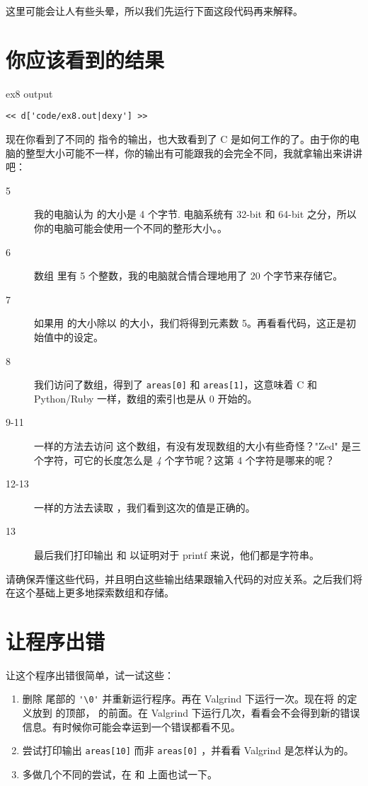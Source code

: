 这里可能会让人有些头晕，所以我们先运行下面这段代码再来解释。

\section{你应该看到的结果}

\begin{code}{ex8 output}
\begin{lstlisting}
<< d['code/ex8.out|dexy'] >>
\end{lstlisting}
\end{code}

现在你看到了不同的  指令的输出，也大致看到了 C 是如何工作的了。由于你的电脑的整型大小可能不一样，你的输出有可能跟我的会完全不同，我就拿输出来讲讲吧：

\begin{description}
\item [5] 我的电脑认为  的大小是 4 个字节. 电脑系统有 32-bit 和 64-bit 之分，所以你的电脑可能会使用一个不同的整形大小。。
\item [6] 数组  里有 5 个整数，我的电脑就合情合理地用了 20 个字节来存储它。
\item [7] 如果用  的大小除以  的大小，我们将得到元素数 5。再看看代码，这正是初始值中的设定。
\item [8] 我们访问了数组，得到了 \verb|areas[0]| 和 \verb|areas[1]|，这意味着 C 和 Python/Ruby 一样，数组的索引也是从 0 开始的。
\item [9-11] 一样的方法去访问  这个数组，有没有发现数组的大小有些奇怪？"Zed" 是三个字符，可它的长度怎么是 \emph{4} 个字节呢？这第 4 个字符是哪来的呢？
\item [12-13] 一样的方法去读取 ，我们看到这次的值是正确的。 
\item [13] 最后我们打印输出  和  以证明对于 printf 来说，他们都是字符串。
\end{description}

请确保弄懂这些代码，并且明白这些输出结果跟输入代码的对应关系。之后我们将在这个基础上更多地探索数组和存储。

\section{让程序出错}

让这个程序出错很简单，试一试这些：

\begin{enumerate}
\item 删除  尾部的 \verb|'\0'| 并重新运行程序。再在 Valgrind 下运行一次。现在将  的定义放到  的顶部， 的前面。在 Valgrind 下运行几次，看看会不会得到新的错误信息。有时候你可能会幸运到一个错误都看不见。
\item 尝试打印输出 \verb|areas[10]| 而非 \verb|areas[0]| ，并看看 Valgrind 是怎样认为的。
\item 多做几个不同的尝试，在  和  上面也试一下。
\end{enumerate}

